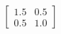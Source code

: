 \documentclass[preview]{standalone}
\begin{document}
\begin{align*}
\begin{bmatrix} 1.5 & 0.5 \\ 0.5 & 1.0 \end{bmatrix}
\end{align*}
\end{document}
